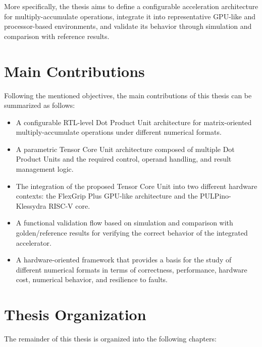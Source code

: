 More specifically, the thesis aims to define a configurable acceleration
architecture for multiply-accumulate operations, integrate it into
representative GPU-like and processor-based environments, and validate its
behavior through simulation and comparison with reference results.


\section{Main Contributions}

Following the mentioned objectives, the main contributions of this thesis can be summarized as follows:

\begin{itemize}

\item A configurable RTL-level Dot Product Unit architecture for
matrix-oriented multiply-accumulate operations under different numerical
formats.

\item A parametric Tensor Core Unit architecture composed of multiple Dot
Product Units and the required control, operand handling, and result
management logic.

\item The integration of the proposed Tensor Core Unit into two different
hardware contexts: the FlexGrip Plus GPU-like architecture and the
PULPino-Klessydra RISC-V core.

\item A functional validation flow based on simulation and comparison with
golden/reference results for verifying the correct behavior of the integrated
accelerator.

\item A hardware-oriented framework that provides a basis for the study of different
numerical formats in terms of correctness, performance, hardware cost,
numerical behavior, and resilience to faults.

\end{itemize}

\section{Thesis Organization}

The remainder of this thesis  is organized into the following chapters:

